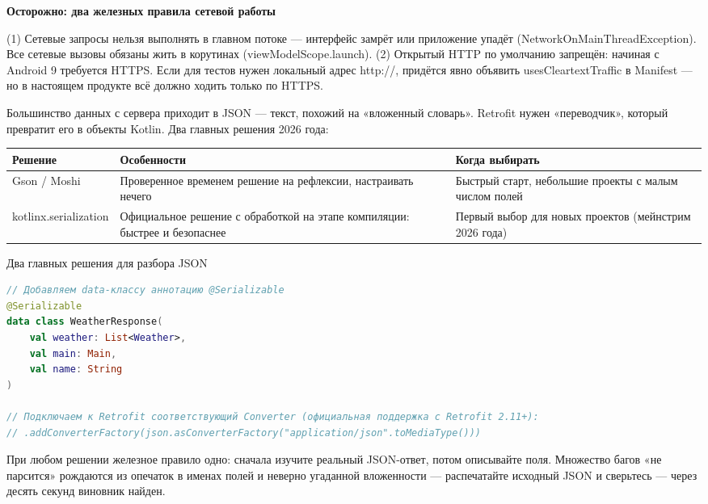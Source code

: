 \textbf{Осторожно: два железных правила сетевой работы}\par

(1) Сетевые запросы нельзя выполнять в главном потоке — интерфейс замрёт или приложение упадёт (NetworkOnMainThreadException). Все сетевые вызовы обязаны жить в корутинах (viewModelScope.launch). (2) Открытый HTTP по умолчанию запрещён: начиная с Android 9 требуется HTTPS. Если для тестов нужен локальный адрес http://, придётся явно объявить usesCleartextTraffic в Manifest — но в настоящем продукте всё должно ходить только по HTTPS.


Большинство данных с сервера приходит в JSON — текст, похожий на «вложенный словарь». Retrofit нужен «переводчик», который превратит его в объекты Kotlin. Два главных решения 2026 года:

\begin{center}
\begin{tabularx}{\linewidth}{|X|X|X|}
\hline
\textbf{Решение} & \textbf{Особенности} & \textbf{Когда выбирать} \tabularnewline
\hline
Gson / Moshi & Проверенное временем решение на рефлексии, настраивать нечего & Быстрый старт, небольшие проекты с малым числом полей \tabularnewline
kotlinx.serialization & Официальное решение с обработкой на этапе компиляции: быстрее и безопаснее & Первый выбор для новых проектов (мейнстрим 2026 года) \tabularnewline
\hline
\end{tabularx}
\end{center}

\begin{center}\small\color{gray}Два главных решения для разбора JSON\end{center}

\begin{lstlisting}[language=Kotlin]
// Добавляем data-классу аннотацию @Serializable
@Serializable
data class WeatherResponse(
    val weather: List<Weather>,
    val main: Main,
    val name: String
)

// Подключаем к Retrofit соответствующий Converter (официальная поддержка с Retrofit 2.11+):
// .addConverterFactory(json.asConverterFactory("application/json".toMediaType()))
\end{lstlisting}

При любом решении железное правило одно: сначала изучите реальный JSON-ответ, потом описывайте поля. Множество багов «не парсится» рождаются из опечаток в именах полей и неверно угаданной вложенности — распечатайте исходный JSON и сверьтесь — через десять секунд виновник найден.


